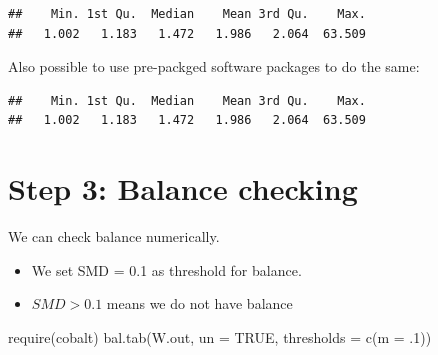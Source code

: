 \documentclass[
]{book}
\newenvironment{Shaded}{\begin{snugshade}}{\end{snugshade}}
\newcommand{\AttributeTok}[1]{\textcolor[rgb]{0.77,0.63,0.00}{#1}}
\newcommand{\ConstantTok}[1]{\textcolor[rgb]{0.00,0.00,0.00}{#1}}
\newcommand{\DecValTok}[1]{\textcolor[rgb]{0.00,0.00,0.81}{#1}}
\newcommand{\FunctionTok}[1]{\textcolor[rgb]{0.00,0.00,0.00}{#1}}
\newcommand{\NormalTok}[1]{#1}
\newcommand{\OtherTok}[1]{\textcolor[rgb]{0.56,0.35,0.01}{#1}}
\newcommand{\SpecialCharTok}[1]{\textcolor[rgb]{0.00,0.00,0.00}{#1}}
\newcommand{\StringTok}[1]{\textcolor[rgb]{0.31,0.60,0.02}{#1}}
\providecommand{\tightlist}{%
  \setlength{\itemsep}{0pt}\setlength{\parskip}{0pt}}
\begin{document}
\begin{verbatim}
##    Min. 1st Qu.  Median    Mean 3rd Qu.    Max. 
##   1.002   1.183   1.472   1.986   2.064  63.509
\end{verbatim}

Also possible to use pre-packged software packages to do the same:

\begin{Shaded}
\end{Shaded}

\begin{verbatim}
##    Min. 1st Qu.  Median    Mean 3rd Qu.    Max. 
##   1.002   1.183   1.472   1.986   2.064  63.509
\end{verbatim}

\hypertarget{step-3-balance-checking}{%
\section{Step 3: Balance checking}\label{step-3-balance-checking}}

We can check balance numerically.

\begin{itemize}
\tightlist
\item
  We set SMD = 0.1 as threshold for balance.
\item
  \(SMD \gt 0.1\) means we do not have balance
\end{itemize}

\begin{Shaded}
\begin{Highlighting}[]
\FunctionTok{require}\NormalTok{(cobalt)}
\FunctionTok{bal.tab}\NormalTok{(W.out, }\AttributeTok{un =} \ConstantTok{TRUE}\NormalTok{, }
        \AttributeTok{thresholds =} \FunctionTok{c}\NormalTok{(}\AttributeTok{m =}\NormalTok{ .}\DecValTok{1}\NormalTok{))}
\end{Highlighting}
\end{Shaded}
\end{document}
